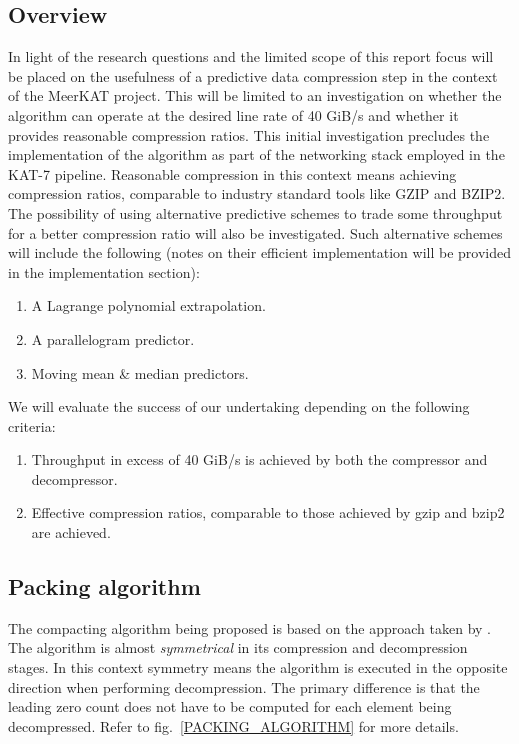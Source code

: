 \subsection{Overview}
In light of the research questions and the limited scope of this report focus will be placed on the usefulness of a predictive data compression 
step in the context of the MeerKAT project. This will be limited to an investigation on whether the algorithm can operate at the desired line rate of
40 GiB/s and whether it provides reasonable compression ratios. This initial investigation precludes the implementation of the algorithm as part of 
the networking stack employed in the KAT-7 pipeline. Reasonable compression in this context means achieving compression ratios, comparable to industry standard 
tools like GZIP and BZIP2. The possibility of using alternative predictive schemes to trade some throughput for a better compression ratio will also be investigated.
Such alternative schemes will include the following (notes on their efficient implementation will be provided in the implementation section):
\begin{enumerate}
 \item A Lagrange polynomial extrapolation.
 \item A parallelogram predictor.
 \item Moving mean \& median predictors.
\end{enumerate}
We will evaluate the success of our undertaking depending on the following criteria:
\begin{enumerate}
 \item Throughput in excess of 40 GiB/s is achieved by both the compressor and decompressor.
 \item Effective compression ratios, comparable to those achieved by gzip and bzip2 are achieved.
\end{enumerate}
\subsection{Packing algorithm}
The compacting algorithm being proposed is based on the approach taken by \cite{O'Neil:2011:FDC:1964179.1964189}. The algorithm is almost \textit{symmetrical} in its compression and 
decompression stages. In this context symmetry means the algorithm is executed in the opposite direction when performing decompression. The primary difference is that the leading 
zero count does not have to be computed for each element being decompressed. Refer to fig.~\ref{PACKING_ALGORITHM} for more details.

